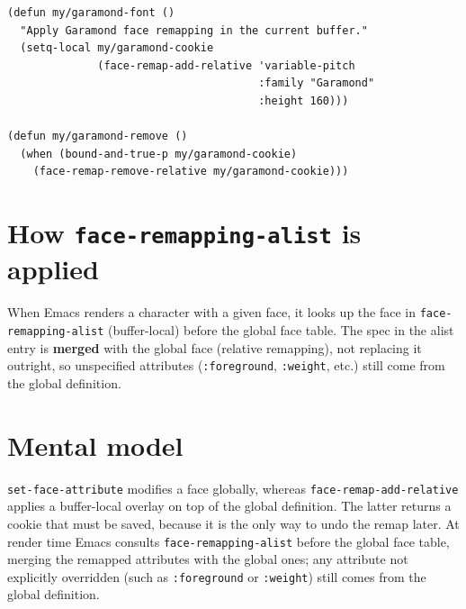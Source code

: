 \begin{verbatim}
(defun my/garamond-font ()
  "Apply Garamond face remapping in the current buffer."
  (setq-local my/garamond-cookie
              (face-remap-add-relative 'variable-pitch
                                       :family "Garamond"
                                       :height 160)))

(defun my/garamond-remove ()
  (when (bound-and-true-p my/garamond-cookie)
    (face-remap-remove-relative my/garamond-cookie)))
\end{verbatim}

\section{How \texttt{face-remapping-alist} is applied}\label{how-face-remapping-alist-is-applied}

When Emacs renders a character with a given face, it looks up the face in \texttt{face-remapping-alist} (buffer-local) before the global face table. The spec in the alist entry is \textbf{merged} with the global face (relative remapping), not replacing it outright, so unspecified attributes (\texttt{:foreground}, \texttt{:weight}, etc.) still come from the global definition.

\section{Mental model}
\texttt{set-face-attribute} modifies a face globally, whereas
\texttt{face-remap-add-relative} applies a buffer-local overlay on top of the
global definition.  The latter returns a cookie that must be saved, because it
is the only way to undo the remap later.  At render time Emacs consults
\texttt{face-remapping-alist} before the global face table, merging the
remapped attributes with the global ones; any attribute not explicitly
overridden (such as \texttt{:foreground} or \texttt{:weight}) still comes
from the global definition.
